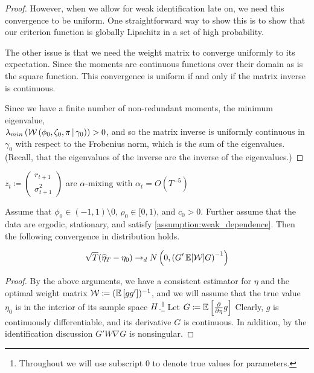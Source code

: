 \documentclass[11pt, letterpaper, twoside, final]{article}
\begin{document}
\begin{appendices}
\begin{proof}
    However, when we allow for weak identification late on, we need this convergence to be uniform. 
    One straightforward way to show this is to show that our criterion function is globally Lipschitz in a set of
    high probability. 
    
    The other issue is that we need the weight matrix to converge uniformly to its expectation.
    Since the moments are continuous functions over their domain as is the square function.
    This convergence is uniform if and only if the matrix inverse is continuous.
    
    Since we have a finite number of non-redundant moments, the minimum eigenvalue, \\
    $\lambda_{min}\left(\mathcal{W}\left(\phi_0, \zeta_0, \pi \,\middle\vert\, \gamma_0\right)\right) > 0$, and so the matrix inverse
    is uniformly continuous in $\gamma_0$ with respect to the Frobenius norm, which is the sum of the eigenvalues.
    (Recall, that the eigenvalues of the inverse are the inverse of the eigenvalues.)


\end{proof}


\begin{assump}
    \label{assumption:weak_dependence}
    $z_t \coloneqq \begin{pmatrix} r_{t+1} \\ \sigma^2_{t+1} \end{pmatrix}$ are $\alpha$-mixing with $\alpha_t =
       O\left(T^{-5}\right)$
\end{assump}


\begin{theorem}
    Assume that $\phi_0  \in (-1,1) \setminus 0$, $\rho_0 \in [0,1)$, and $c_0 > 0$. 
    Further assume that the data are ergodic, stationary, and satisfy \cref{assumption:weak_dependence}.
    Then the following convergence in distribution holds.

    \begin{equation}
    \sqrt{T} (\widehat{\eta}_T - \eta_0) \to_d N\left(0, \left(G' \operatorname{\mathbb{E}}[\mathcal{W}] G\right)^{-1}\right)
    \end{equation}
\end{theorem}

\begin{proof}

    By the above arguments, we have a consistent estimator for $\eta$ and the optimal weight matrix $\mathcal{W} \coloneqq
    (\operatorname{\mathbb{E}}\left[g g'\right])^{-1}$, and we will assume that the true value $\eta_{0}$ is in the interior of its
    sample space $H$.\footnote{Throughout we will use subscript \num{0}  to denote true values for parameters.}
    Let $G \coloneqq \operatorname{\mathbb{E}}\left[\frac{\partial}{\partial \eta} g \right]$ Clearly, $g$ is continuously
    differentiable, and its derivative $G$ is continuous.
    In addition, by the identification discussion $G' W \nabla G$ is nonsingular.
    

\end{proof}
\end{appendices}
\end{document}
